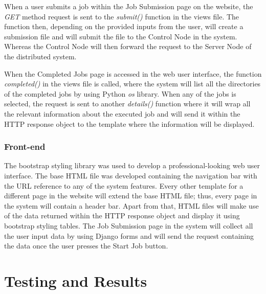 \documentclass[10pt]{report}
\begin{document}
When a user submits a job within the Job Submission page on the website, the \textit{GET} method request is sent to the \textit{submit()} function in the views file. The function then, depending on the provided inputs from the user, will create a submission file and will submit the file to the Control Node in the system. Whereas the Control Node will then forward the request to the Server Node of the distributed system.
\newline

When the Completed Jobs page is accessed in the web user interface, the function \textit{completed()} in the views file is called, where the system will list all the directories of the completed jobs by using Python \textit{os} library. When any of the jobs is selected, the request is sent to another \textit{details()} function where it will wrap all the relevant information about the executed job and will send it within the HTTP response object to the template where the information will be displayed.

\subsection{Front-end}

The bootstrap styling library was used to develop a professional-looking web user interface. The base HTML file was developed containing the navigation bar with the URL reference to any of the system features. Every other template for a different page in the website will extend the base HTML file; thus, every page in the system will contain a header bar. Apart from that, HTML files will make use of the data returned within the HTTP response object and display it using bootstrap styling tables. The Job Submission page in the system will collect all the user input data by using Django forms and will send the request containing the data once the user presses the Start Job button.



\chapter{Testing and Results}
\end{document}
